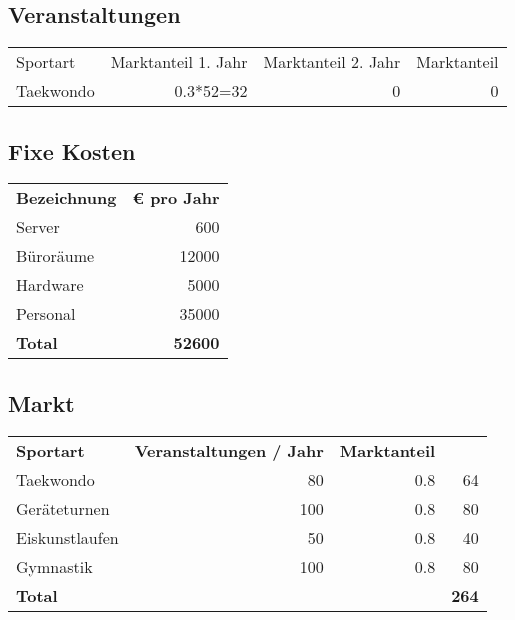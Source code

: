 \subsection{Veranstaltungen}

\begin{table}[H]

    \begin{tabular}{l r r r}
        Sportart				& Marktanteil 1. Jahr & Marktanteil 2. Jahr & Marktanteil \\
        Taekwondo               & 0.3*52=32 & 0    & 0\\
    \end{tabular}
    \label{tab:veranstaltungen}
\end{table}



\subsection{Fixe Kosten}

\begin{table}[H]

    \begin{tabular}{l r}
        \textbf{Bezeichnung}    & \textbf{€ pro Jahr}\\
        Server                  & 600\\
        Büroräume               & 12000\\
        Hardware                & 5000\\
        Personal                & 35000\\
        \midrule
        \textbf{Total}          & \textbf{52600}
    \end{tabular}
    \label{tab:Fixkosten}
\end{table}

\subsection{Markt}

\begin{table}[H]

    \begin{tabular}{l r r r}
        \textbf{Sportart}       & \textbf{Veranstaltungen / Jahr}   & \textbf{Marktanteil}      &  \\
        Taekwondo               & 80                                & 0.8                       & 64\\
        Geräteturnen            & 100                               & 0.8                       & 80\\
        Eiskunstlaufen          & 50                                & 0.8                       & 40\\
        Gymnastik               & 100                               & 0.8                       & 80\\
        \midrule
        \textbf{Total}          &                                   &                           & \textbf{264}
    \end{tabular}
    \label{tab:Markt}
\end{table}

